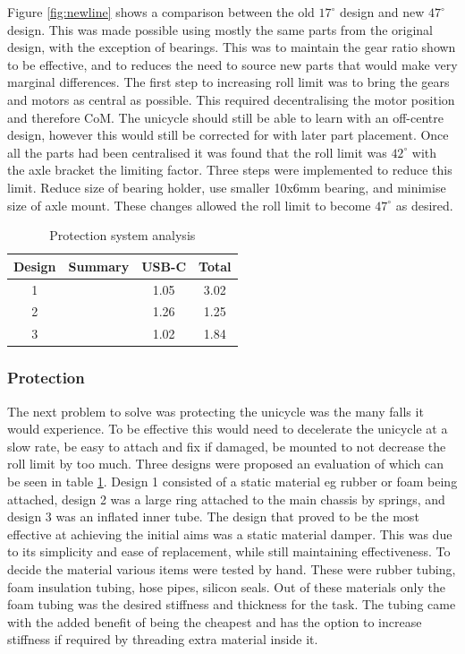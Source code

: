 \documentclass[twoside,twocolumn,12pt]{article}
\begin{document}
Figure \ref{fig:newline} shows a comparison between the old $17^{\circ}$ design and new $47^{\circ}$ design. This was made possible using mostly the same parts from the original design, with the exception of bearings. This was to maintain the gear ratio shown to be effective, and to reduces the need to source new parts that would make very marginal differences. 
\newline
The first step to increasing roll limit was to bring the gears and motors as central as possible. This required decentralising the motor position and therefore CoM. The unicycle should still be able to learn with an off-centre design, however this would still be corrected for with later part placement. Once all the parts had been centralised it was found that the roll limit was $42^{\circ}$ with the axle bracket the limiting factor. 
\newline
Three steps were implemented to reduce this limit. Reduce size of bearing holder, use smaller 10x6mm bearing, and minimise size of axle mount. These changes allowed the roll limit to become $47^{\circ}$ as desired.
\begin{table}[ht!]
\centering
\begin{tabular}{ c | c | c | c }
Design& Summary & USB-C & Total\\ 
\midrule
1&&1.05 &3.02\\
2&& 1.26&1.25\\
3&&1.02 &1.84\\
\end{tabular}
\caption{Protection system analysis}
\label{tab:pro}
\end{table}

\subsubsection{Protection}
The next problem to solve was protecting the unicycle was the many falls it would experience. To be effective this would need to decelerate the unicycle at a slow rate, be easy to attach and fix if damaged, be mounted to not decrease the roll limit by too much.
\newline
Three designs were proposed an evaluation of which can be seen in table \ref{tab:pro}. Design 1 consisted of a static material eg rubber or foam being attached, design 2 was a large ring attached to the main chassis by springs, and design 3 was an inflated inner tube. The design that proved to be the most effective at achieving the initial aims was a static material damper. This was due to its simplicity and ease of replacement, while still maintaining effectiveness. To decide the material various items were tested by hand. These were rubber tubing, foam insulation tubing, hose pipes, silicon seals. Out of these materials only the foam tubing was the desired stiffness and thickness for the task. The tubing came with the added benefit of being the cheapest and has the option to increase stiffness if required by threading extra material inside it.
\end{document}
